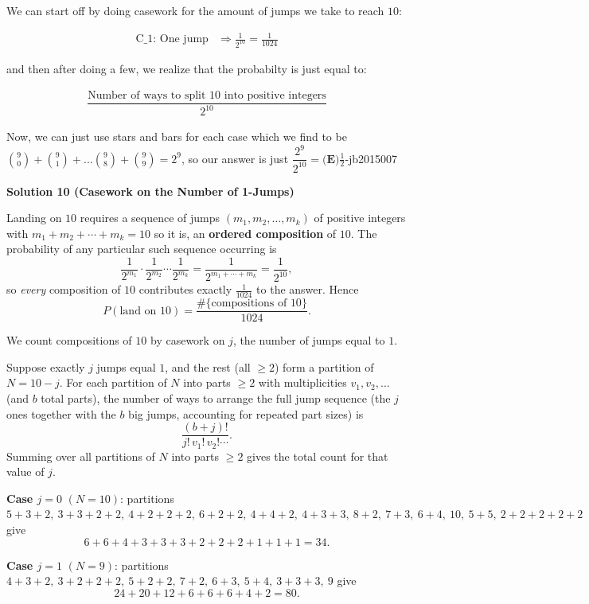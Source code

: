 \begin{enumerate}
We can start off by doing casework for the amount of jumps we take to reach $10$:  

 \begin{align}\text{C_1: One jump} &\Longrightarrow \frac{1}{2^{10}} = \frac{1}{1024}\end{align}

 and then after doing a few, we realize that the probabilty is just equal to:

 \begin{align}\dfrac{\text{Number of ways to split 10 into positive integers}}{2^{10}}\end{align}

 Now, we can just use stars and bars for each case which we find to be $\binom{9}{0} + \binom{9}{1} + ... \binom{9}{8} + \binom{9}{9} = 2^9$, so our answer is just $\dfrac{2^9}{2^{10}} = \boxed{\textbf{(E)}\frac{1}{2}}$-jb2015007

 



\textbf{Solution 10 (Casework on the Number of 1-Jumps)}

Landing on $10$ requires a sequence of jumps $(m_1, m_2, \dots, m_k)$ of positive integers with $m_1+m_2+\cdots+m_k=10$ so it is, an \textbf{ordered composition} of $10$. The probability of any particular such sequence occurring is
 \[\frac{1}{2^{m_1}}\cdot\frac{1}{2^{m_2}}\cdots\frac{1}{2^{m_k}}=\frac{1}{2^{m_1+\cdots+m_k}}=\frac{1}{2^{10}},\]so \textit{every} composition of $10$ contributes exactly $\frac{1}{1024}$ to the answer. Hence
 \[P(\text{land on }10)=\frac{\#\{\text{compositions of }10\}}{1024}.\]

 We count compositions of $10$ by casework on $j$, the number of jumps equal to $1$.

 Suppose exactly $j$ jumps equal $1$, and the rest (all $\ge 2$) form a partition of $N=10-j$. For each partition of $N$ into parts $\ge 2$ with multiplicities $v_1,v_2,\dots$ (and $b$ total parts), the number of ways to arrange the full jump sequence (the $j$ ones together with the $b$ big jumps, accounting for repeated part sizes) is
 \[\frac{(b+j)!}{j!\,v_1!\,v_2!\cdots}.\]Summing over all partitions of $N$ into parts $\ge2$ gives the total count for that value of $j$.

 \textbf{Case $j=0$ } $(N=10)$: partitions $5{+}3{+}2,\ 3{+}3{+}2{+}2,\ 4{+}2{+}2{+}2,\ 6{+}2{+}2,\ 4{+}4{+}2,\ 4{+}3{+}3,\ 8{+}2,\ 7{+}3,\ 6{+}4,\ 10,\ 5{+}5,\ 2{+}2{+}2{+}2{+}2$ give
 \[6+6+4+3+3+3+2+2+2+1+1+1=34.\]

 \textbf{Case $j=1$} $(N=9)$: partitions $4{+}3{+}2,\ 3{+}2{+}2{+}2,\ 5{+}2{+}2,\ 7{+}2,\ 6{+}3,\ 5{+}4,\ 3{+}3{+}3,\ 9$ give
 \[24+20+12+6+6+6+4+2=80.\]


\end{enumerate}
